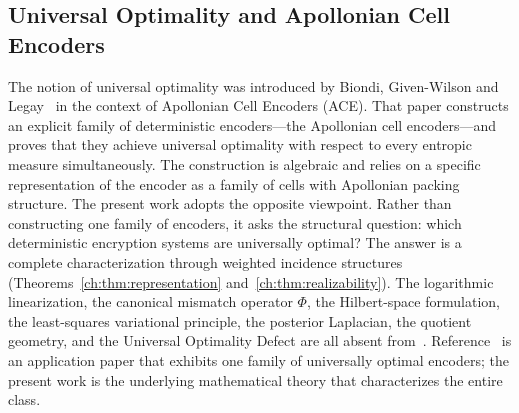 \subsection*{Universal Optimality and Apollonian Cell Encoders}
The notion of universal optimality was introduced by Biondi,
Given-Wilson and Legay~\cite{biondi2018apollonian} in the context of
Apollonian Cell Encoders (ACE).  That paper constructs an explicit
family of deterministic encoders---the Apollonian cell encoders---and
proves that they achieve universal optimality with respect to every
entropic measure simultaneously.  The construction is algebraic and
relies on a specific representation of the encoder as a family of
cells with Apollonian packing structure.
The present work adopts the opposite viewpoint.  Rather than
constructing one family of encoders, it asks the structural question:
which deterministic encryption systems are universally optimal?  The
answer is a complete characterization through weighted incidence
structures (Theorems~\ref{ch:thm:representation}
and~\ref{ch:thm:realizability}).  The logarithmic linearization, the
canonical mismatch operator $\Phi$, the Hilbert-space formulation, the
least-squares variational principle, the posterior Laplacian, the
quotient geometry, and the Universal Optimality Defect are all absent
from~\cite{biondi2018apollonian}.  Reference~\cite{biondi2018apollonian}
is an application paper that exhibits one family of universally optimal
encoders; the present work is the underlying mathematical theory that
characterizes the entire class.
